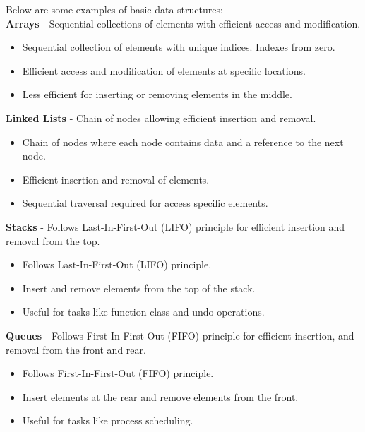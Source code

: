 \begin{solution}
    \noindent Below are some examples of basic data structures: \\

    \noindent \textbf{Arrays} - Sequential collections of elements with efficient access and modification.
    \begin{itemize}
        \item Sequential collection of elements with unique indices. Indexes from zero.
        \item Efficient access and modification of elements at specific locations.
        \item Less efficient for inserting or removing elements in the middle.
    \end{itemize}

    \noindent \textbf{Linked Lists} - Chain of nodes allowing efficient insertion and removal.
    \begin{itemize}
        \item Chain of nodes where each node contains data and a reference to the next node.
        \item Efficient insertion and removal of elements.
        \item Sequential traversal required for access specific elements.
    \end{itemize}

    \noindent \textbf{Stacks} - Follows Last-In-First-Out (LIFO) principle for efficient insertion and removal from the top.
    \begin{itemize}
        \item Follows Last-In-First-Out (LIFO) principle.
        \item Insert and remove elements from the top of the stack.
        \item Useful for tasks like function class and undo operations.
    \end{itemize}

    \noindent \textbf{Queues} - Follows First-In-First-Out (FIFO) principle for efficient insertion, and removal from the front
    and rear.
    \begin{itemize}
        \item Follows First-In-First-Out (FIFO) principle.
        \item Insert elements at the rear and remove elements from the front.
        \item Useful for tasks like process scheduling.
    \end{itemize}


\end{solution}
